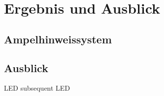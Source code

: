 \chapter{Ergebnis und Ausblick}
\section{Ampelhinweissystem}
\section{Ausblick}
\gls{LED} subsequent \gls{LED}
